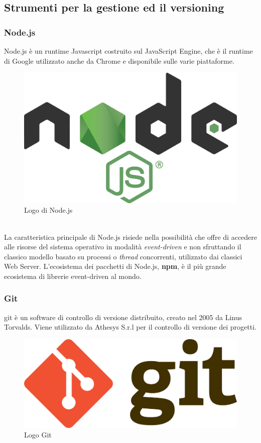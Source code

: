 \subsection{Strumenti per la gestione ed il versioning}
\subsubsection{Node.js}
Node.js è un runtime Javascript costruito sul JavaScript Engine\cite{nodeGuida}, che è il runtime di Google utilizzato anche da Chrome e disponibile sulle varie piattaforme.
\begin{figure}[h]
	\centering
	\includegraphics[scale=0.05]{immagini/nodejs}
	\caption{Logo di Node.js}
\end{figure}
\\
La caratteristica principale di Node.js risiede nella possibilità che offre di accedere alle risorse del sistema operativo in modalità \emph{\gls{event-driven}}\glsfirstoccur\cite{nodeEvent} e non sfruttando il classico modello basato su processi o \textit{thread} concorrenti, utilizzato dai classici Web Server. L'ecosistema dei pacchetti di Node.js, \textbf{npm}, è il più grande ecosistema di librerie \gls{event-driven} al mondo.
\subsubsection{Git}
\gls{git} è un software di controllo di versione distribuito, creato nel 2005 da Linus Torvalds\cite{gitSite}. Viene utilizzato da Athesys S.r.l per il controllo di versione dei progetti.
\begin{figure}[h]
	\centering
	\includegraphics[scale=0.05]{immagini/git}
	\caption{Logo Git}
\end{figure}

